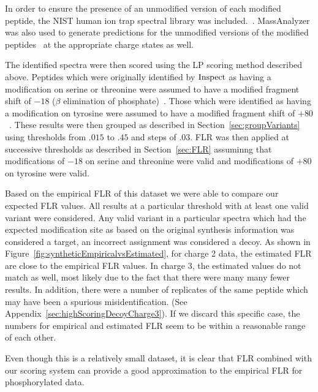 \documentclass[11pt]{article}
\newcommand{\inspect}{${\rm Inspect}$}
\begin{document}
{In order to ensure the presence of an unmodified version of each modified peptide, the NIST human ion trap spectral library was included.~\cite{speclib_nist_human_yeast}. MassAnalyzer was also used to generate predictions for the unmodified versions of the modified peptides~\cite{zhang04,zhang05,zhang10} at the appropriate charge states as well.

The identified spectra were then scored using the LP scoring method described above. Peptides which were originally identified by {\inspect} as having a modification on serine or threonine were assumed to have a modified fragment shift of $-18$ ($\beta$ elimination of phosphate)~\cite{Groenborg2002}. Those which were identified as having a modification on tyrosine were assumed to have a modified fragment shift of $+80$~\cite{Steen2001}. These results were then grouped as described in Section~\ref{sec:groupVariants} using thresholds from $.015$ to $.45$ and steps of $.03$. FLR was then applied at successive thresholds as described in Section~\ref{sec:FLR} assuminng that modifications of $-18$ on serine and threonine were valid and modifications of $+80$ on tyrosine were valid.

Based on the empirical FLR of this dataset we were able to compare our expected FLR values. All results at a particular threshold with at least one valid variant were considered. Any valid variant in a particular spectra which had the expected modification site as based on the original synthesis information was considered a target, an incorrect assignment was considered a decoy. As shown in Figure~\ref{fig:syntheticEmpiricalvsEstimated}, for charge 2 data, the estimated FLR are close to the empirical FLR values. In charge 3, the estimated values do not match as well, most likely due to the fact that there were many many fewer results. In addition, there were a number of replicates of the same peptide which may have been a spurious misidentification. (See Appendix~\ref{sec:highScoringDecoyCharge3}). If we discard this specific case, the numbers for empirical and estimated FLR seem to be within a reasonable range of each other.

Even though this is a relatively small dataset, it is clear that FLR combined with our scoring system can provide a good approximation to the empirical FLR for phosphorylated data.

}
\end{document}
